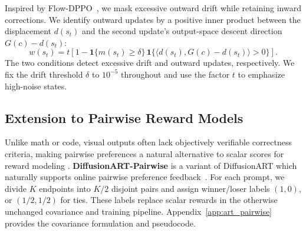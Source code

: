 \documentclass{article}
\begin{document}
Inspired by Flow-DPPO~\citep{ping2026flowdppo}, we mask excessive outward drift while retaining inward corrections. We identify outward updates by a positive inner product between the displacement $d(s_t)$ and the second update's output-space descent direction $G(c)-d(s_t)$:
\begin{equation}
 w(s_t)=t\left[1-\mathbf1\{m(s_t)\geq\delta\}\,
 \mathbf1\{\langle d(s_t),G(c)-d(s_t)\rangle>0\}\right].
 \label{eq:art_trust_mask}
\end{equation}
The two conditions detect excessive drift and outward updates, respectively. We fix the drift threshold $\delta$ to $10^{-5}$ throughout and use the factor $t$ to emphasize high-noise states.



\begingroup

\begin{algorithm}[!htbp]
\caption{DiffusionART: one training iteration}\label{alg:flowart}
\small
{}
\end{algorithm}
\endgroup

\subsection{Extension to Pairwise Reward Models}
\label{sec:art_pairwise}
Unlike math or code, visual outputs often lack objectively verifiable correctness criteria, making pairwise preferences a natural alternative to scalar scores for reward modeling \citep{kirstain2023pickapic}. \textbf{DiffusionART-Pairwise} is a variant of DiffusionART which naturally supports online pairwise preference feedback~\citep{kirstain2023pickapic}. For each prompt, we divide $K$
  endpoints into $K/2$ disjoint pairs and assign winner/loser labels $(1,0)$, or $(1/2,1/2)$ for ties. These labels replace scalar
  rewards in the otherwise unchanged covariance and training pipeline. Appendix~\ref{app:art_pairwise} provides the covariance
  formulation and pseudocode.
\end{document}
